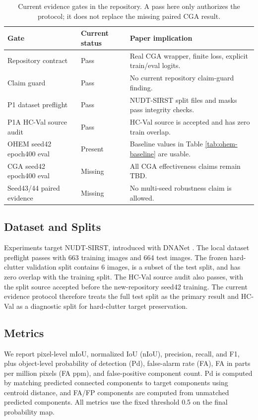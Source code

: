 \documentclass[letterpaper]{article}
\begin{document}
\begin{table}[t]
\centering
\caption{Current evidence gates in the repository. A pass here only authorizes the protocol; it does not replace the missing paired CGA result.}
\label{tab:evidence-gates}
\small
\begin{tabular}{lll}
\toprule
Gate & Current status & Paper implication \\
\midrule
Repository contract & Pass & Real CGA wrapper, finite loss, explicit train/eval logits. \\
Claim guard & Pass & No current repository claim-guard finding. \\
P1 dataset preflight & Pass & NUDT-SIRST split files and masks pass integrity checks. \\
P1A HC-Val source audit & Pass & HC-Val source is accepted and has zero train overlap. \\
OHEM seed42 epoch400 eval & Present & Baseline values in Table \ref{tab:ohem-baseline} are usable. \\
CGA seed42 epoch400 eval & Missing & All CGA effectiveness claims remain TBD. \\
Seed43/44 paired evidence & Missing & No multi-seed robustness claim is allowed. \\
\bottomrule
\end{tabular}
\end{table}

\subsection{Dataset and Splits}

Experiments target NUDT-SIRST, introduced with DNANet \citep{li2023dnanet}. The local dataset preflight passes with 663 training images and 664 test images. The frozen hard-clutter validation split contains 6 images, is a subset of the test split, and has zero overlap with the training split. The HC-Val source audit also passes, with the split source accepted before the new-repository seed42 training. The current evidence protocol therefore treats the full test split as the primary result and HC-Val as a diagnostic split for hard-clutter target preservation.

\subsection{Metrics}

We report pixel-level mIoU, normalized IoU (nIoU), precision, recall, and F1, plus object-level probability of detection (Pd), false-alarm rate (FA), FA in parts per million pixels (FA ppm), and false-positive component count. Pd is computed by matching predicted connected components to target components using centroid distance, and FA/FP components are computed from unmatched predicted components. All metrics use the fixed threshold 0.5 on the final probability map.
\end{document}
